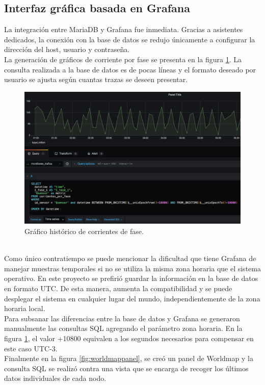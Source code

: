 \subsection{Interfaz gráfica basada en Grafana}
La integración entre MariaDB y Grafana fue inmediata. Gracias a asistentes dedicados, la conexión con la base de datos se redujo únicamente a configurar la dirección del host, usuario y contraseña.\\
La generación de gráficos de corriente por fase se presenta en la figura \ref{fig:historicofase}. La consulta realizada a la base de datos es de pocas líneas y el formato deseado por usuario se ajusta seg\'{u}n cuantas trazas se deseen presentar.\\
\begin{figure}[h]
	\centering
	\includegraphics[width=0.9\linewidth]{Figures/historico_fase}
	\caption{Gráfico histórico de corrientes de fase.}
	\label{fig:historicofase}
\end{figure}\\
Como único contratiempo se puede mencionar la dificultad que tiene Grafana de manejar muestras temporales si no se utiliza la misma zona horaria que el sistema operativo. En este proyecto se prefirió guardar la información en la base de datos en formato UTC. De esta manera, aumenta la compatibilidad y se puede desplegar el sistema en cualquier lugar del mundo, independientemente de la zona horaria local.\\
Para subsanar las diferencias entre la base de datos y Grafana se generaron manualmente las consultas SQL agregando el parámetro zona horaria. En la figura \ref{fig:historicofase}, el valor +10800 equivalen a los segundos necesarios para compensar en este caso UTC-3.\\
Finalmente en la figura \ref{fig:worldmappanel}, se creó un panel de Worldmap y la consulta SQL se realizó contra una vista que se encarga de recoger los últimos datos individuales de cada nodo.\\

